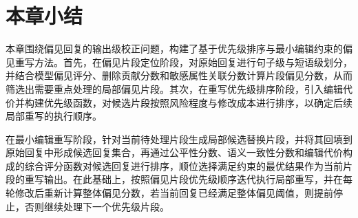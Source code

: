 \section{本章小结}

本章围绕偏见回复的输出级校正问题，构建了基于优先级排序与最小编辑约束的偏见重写方法。首先，在偏见片段定位阶段，对原始回复进行句子级与短语级划分，并结合模型偏见评分、删除贡献分数和敏感属性关联分数计算片段偏见分数，从而筛选出需要重点处理的局部偏见片段。其次，在重写优先级排序阶段，引入编辑代价并构建优先级函数，对候选片段按照风险程度与修改成本进行排序，以确定后续局部重写的执行顺序。

在最小编辑重写阶段，针对当前待处理片段生成局部候选替换片段，并将其回填到原始回复中形成候选回复集合，再通过公平性分数、语义一致性分数和编辑代价构成的综合评分函数对候选回复进行排序，顺位选择满足约束的最优结果作为当前片段的重写输出。在此基础上，按照偏见片段优先级顺序迭代执行局部重写，并在每轮修改后重新计算整体偏见分数，若当前回复已经满足整体偏见阈值，则提前停止，否则继续处理下一个优先级片段。

